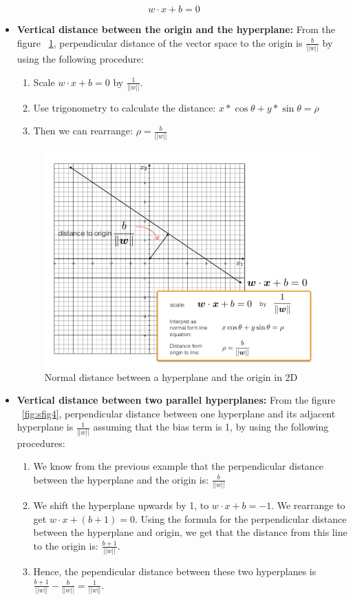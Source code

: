 \documentclass[11pt]{article}
\begin{document}
$$w \cdot x + b = 0$$
\begin{itemize}
\item{
\textbf{Vertical distance between the origin and the hyperplane:} From the figure ~\ref{fig:sfig3}, perpendicular distance of the vector space to the origin is $\frac{b}{||w||}$ by using the following procedure:

\begin{enumerate}
    \item Scale $w \cdot x + b = 0$ by $\frac{1}{||w||}$.
    \item Use trigonometry to calculate the distance: $x*\cos{\theta} + y*\sin{\theta} = \rho$
    \item Then we can rearrange: $\rho = \frac{b}{||w||}$
    
\end{enumerate}

\begin{figure}[H]
  \centering
  \includegraphics[width=.6\linewidth]{normal_distance.png}
  \caption{Normal distance between a hyperplane and the origin in 2D}
  \label{fig:sfig3}
\end{figure}
}

\item{
\textbf{Vertical distance between two parallel hyperplanes:} From the figure ~\ref{fig:sfig4}, perpendicular distance between one hyperplane and its adjacent hyperplane is $\frac{1}{||w||}$ assuming that the bias term is 1,  by using the following procedures:
\begin{enumerate}
    \item We know from the previous example that the perpendicular distance between the hyperplane and the origin is: $\frac{b}{||w||}$
    \item We shift the hyperplane upwards by 1, to $w \cdot x + b = -1$. We rearrange to get $w \cdot x + (b+1)= 0$. Using the formula for the perpendicular distance between the hyperplane and origin, we get that the distance from this line to the origin is: $\frac{b+1}{||w||}$.
    \item Hence, the pependicular distance between these two hyperplanes is $\frac{b+1}{||w||} - \frac{b}{||w||} = \frac{1}{||w||}$.
\end{enumerate}

}
\end{itemize}
\end{document}
